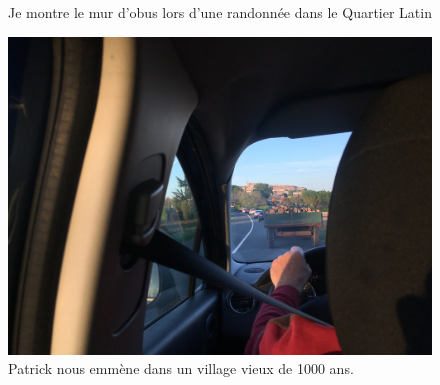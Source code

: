 \documentclass[a4paper,12pt]{article}
\begin{document}
\begin{figure}[htbp]
\begin{minipage}{0.3\textwidth}
		\caption{Je montre le mur d'obus lors d'une randonnée dans le Quartier Latin}
		\label{fig:image2}
	\end{minipage}
	\hfill
	\begin{minipage}{0.3\textwidth}
		\centering
		\includegraphics[width=\linewidth]{321}
		\caption{Patrick nous emmène dans un village vieux de 1000 ans.}
		\label{fig:image3}
	\end{minipage}
	\label{fig:myfigure}
\end{figure}
\end{document}

